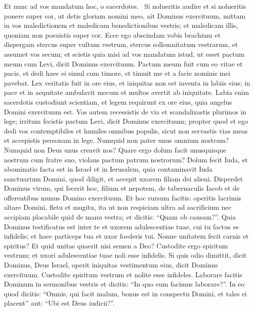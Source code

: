 \begin{biblechapter}
\begin{biblechapter}
\verse Et nunc ad vos mandatum hoc, o sacerdotes. 
 \verse Si nolueritis audire et si nolueritis ponere super cor, ut detis gloriam nomini meo, ait Dominus exercituum, mittam in vos maledictionem et maledicam benedictionibus vestris; et maledicam illis, quoniam non posuistis super cor.
 \verse Ecce ego abscindam vobis brachium
 et dispergam stercus super vultum vestrum,
 stercus sollemnitatum vestrarum,
 et assumet vos secum;
 \verse et scietis quia misi ad vos mandatum istud,
 ut esset pactum meum cum Levi,
 dicit Dominus exercituum.
 \verse Pactum meum fuit cum eo vitae et pacis,
 et dedi haec ei simul cum timore, et timuit me
 et a facie nominis mei pavebat.
 \verse Lex veritatis fuit in ore eius,
 et iniquitas non est inventa in labiis eius;
 in pace et in aequitate ambulavit mecum
 et multos avertit ab iniquitate.
 \verse Labia enim sacerdotis custodiunt scientiam,
 et legem requirunt ex ore eius,
 quia angelus Domini exercituum est.
 \verse Vos autem recessistis de via
 et scandalizastis plurimos in lege;
 irritum fecistis pactum Levi,
 dicit Dominus exercituum;
 \verse propter quod et ego dedi vos
 contemptibiles et humiles omnibus populis,
 sicut non servastis vias meas
 et accepistis personam in lege.
 \verse Numquid non pater unus omnium nostrum? Numquid non Deus unus creavit nos? Quare ergo dolum facit unusquisque nostrum cum fratre suo, violans pactum patrum nostrorum? 
\verse Dolum fecit Iuda, et abominatio facta est in Israel et in Ierusalem, quia contaminavit Iuda sanctuarium Domini, quod diligit, et accepit uxorem filiam dei alieni. 
\verse Disperdet Dominus virum, qui fecerit hoc, filium et nepotem, de tabernaculis Iacob et de offerentibus munus Domino exercituum.
 \verse Et hoc rursum facitis: operitis lacrimis altare Domini, fletu et mugitu, ita ut non respiciam ultra ad sacrificium nec accipiam placabile quid de manu vestra; 
\verse et dicitis: “Quam ob causam?”. Quia Dominus testificatus est inter te et uxorem adulescentiae tuae, cui tu factus es infidelis; et haec particeps tua et uxor foederis tui. 
\verse Nonne unitatem fecit carnis et spiritus? Et quid unitas quaerit nisi semen a Deo? Custodite ergo spiritum vestrum; et uxori adulescentiae tuae noli esse infidelis. 
\verse Si quis odio dimittit, dicit Dominus, Deus Israel, operit iniquitas vestimentum eius, dicit Dominus exercituum. Custodite spiritum vestrum et nolite esse infideles. 
\verse Laborare facitis Dominum in sermonibus vestris et dicitis: “In quo eum facimus laborare?”. In eo quod dicitis: “Omnis, qui facit malum, bonus est in conspectu Domini, et tales ei placent” aut: “Ubi est Deus iudicii?”.
 

\end{biblechapter}
\end{biblechapter}

